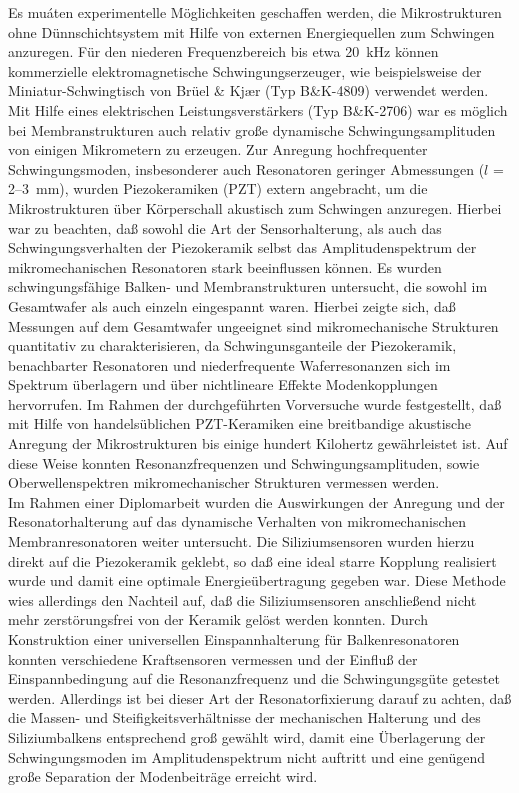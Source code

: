 Es muáten experimentelle Möglichkeiten geschaffen werden, die
Mikrostrukturen ohne Dünnschichtsystem mit Hilfe von externen
Energiequellen zum Schwingen anzuregen. Für den niederen Frequenzbereich
bis etwa 20~kHz können kommerzielle elektromagnetische Schwingungserzeuger,
wie beispielsweise der Miniatur-Schwingtisch von Brüel \& Kj\ae r
(Typ B\&K-4809) verwendet werden. Mit Hilfe eines elektrischen
Leistungsverstärkers (Typ B\&K-2706) war es möglich bei
Membranstrukturen auch relativ große dynamische Schwingungsamplituden
von einigen Mikrometern zu erzeugen. Zur Anregung hochfrequenter
Schwingungsmoden, insbesonderer auch Resonatoren geringer Abmessungen
($l$ = 2--3~mm), wurden Piezokeramiken (PZT) extern angebracht, um die
Mikrostrukturen über
Körperschall akustisch zum Schwingen anzuregen. Hierbei war zu beachten,
daß sowohl die Art der Sensorhalterung, als auch das Schwingungsverhalten
der Piezokeramik selbst das Amplitudenspektrum der mikromechanischen
Resonatoren stark beeinflussen können. Es wurden  schwingungsfähige Balken-
und Membranstrukturen untersucht, die sowohl im Gesamtwafer als auch einzeln
eingespannt waren. Hierbei zeigte sich, daß Messungen
auf dem Gesamtwafer ungeeignet sind mikromechanische Strukturen quantitativ
zu charakterisieren, da Schwingunsganteile der Piezokeramik, benachbarter
Resonatoren und niederfrequente Waferresonanzen sich im Spektrum überlagern
und über nichtlineare Effekte Modenkopplungen hervorrufen. Im Rahmen der
durchgeführten Vorversuche wurde festgestellt, daß mit Hilfe von
handelsüblichen PZT-Keramiken eine breitbandige akustische Anregung der
Mikrostrukturen bis einige hundert Kilohertz gewährleistet ist. Auf diese
Weise konnten Resonanzfrequenzen und Schwingungsamplituden, sowie
Oberwellenspektren mikromechanischer Strukturen vermessen werden.\\
%
Im Rahmen einer Diplomarbeit \cite{Bra92a} wurden die Auswirkungen der
Anregung und der Resonatorhalterung auf das dynamische Verhalten
von mikromechanischen Membranresonatoren weiter untersucht.
Die Siliziumsensoren wurden hierzu direkt auf die Piezokeramik geklebt,
so daß eine ideal starre Kopplung realisiert wurde und damit eine optimale
Energieüber\-tragung gegeben war. Diese Methode wies allerdings den
Nachteil auf, daß die Siliziumsensoren
anschließend nicht mehr zerstörungsfrei von der Keramik gelöst werden
konnten. Durch Konstruktion einer universellen Einspannhalterung für
Balkenresonatoren \cite{Bra92b} konnten verschiedene Kraftsensoren
vermessen und der Einfluß der Einspannbedingung auf die Resonanzfrequenz
und die Schwingungsgüte getestet werden. Allerdings ist bei dieser Art der
Resonatorfixierung darauf zu achten, daß die Massen- und
Steifigkeitsverhältnisse der mechanischen Halterung und des
Siliziumbalkens entsprechend groß gewählt wird, damit eine Überlagerung
der Schwingungsmoden im Amplitudenspektrum nicht auftritt und eine genügend
große Separation der Modenbeiträge erreicht wird.\\


